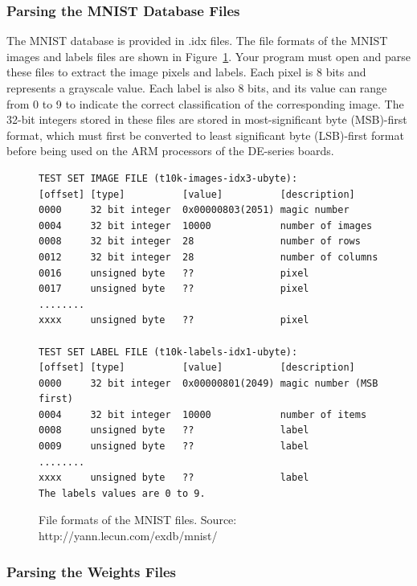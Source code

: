 \documentclass[epsfig,10pt,fullpage]{article}
\begin{document}
\subsubsection*{Parsing the MNIST Database Files}
The MNIST database is provided in .idx files. The file formats of the MNIST images and labels files are shown in Figure~\ref{fig:mnist_file_format}. 
Your program must open and parse these files to extract the image pixels and labels. Each pixel is 8 bits and represents a grayscale value.
Each label is also 8 bits, and its value can range from 0 to 9 to indicate the correct classification of the corresponding image.
The 32-bit integers stored in these files are stored in most-significant byte (MSB)-first format, which
must first be converted to least significant byte (LSB)-first format before being used on the ARM processors of the DE-series boards.

\lstset{}
\begin{figure}[H]
\begin{center}
\begin{minipage}[t]{12.7 cm}
\begin{lstlisting}
TEST SET IMAGE FILE (t10k-images-idx3-ubyte):
[offset] [type]          [value]          [description] 
0000     32 bit integer  0x00000803(2051) magic number 
0004     32 bit integer  10000            number of images 
0008     32 bit integer  28               number of rows 
0012     32 bit integer  28               number of columns 
0016     unsigned byte   ??               pixel 
0017     unsigned byte   ??               pixel 
........ 
xxxx     unsigned byte   ??               pixel

TEST SET LABEL FILE (t10k-labels-idx1-ubyte):
[offset] [type]          [value]          [description] 
0000     32 bit integer  0x00000801(2049) magic number (MSB first) 
0004     32 bit integer  10000            number of items 
0008     unsigned byte   ??               label 
0009     unsigned byte   ??               label 
........ 
xxxx     unsigned byte   ??               label
The labels values are 0 to 9.
\end{lstlisting}
\end{minipage}
\end{center}
\vspace{-.23in}\caption{File formats of the MNIST files. Source: http://yann.lecun.com/exdb/mnist/}
\label{fig:mnist_file_format}
\end{figure}

\subsubsection*{Parsing the Weights Files}
\end{document}
